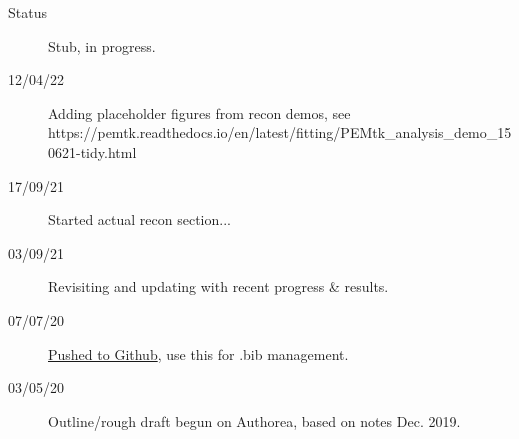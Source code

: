 \begin{description}
\item [{Status}] Stub, in progress.
\item [{12/04/22}] Adding placeholder figures from recon demos, see https://pemtk.readthedocs.io/en/latest/fitting/PEMtk_analysis_demo_150621-tidy.html
\item [{17/09/21}] Started actual recon section...
\item [{03/09/21}] Revisiting and updating with recent progress \& results.
\item [{07/07/20}] \href{https://github.com/phockett/Extracting-Molecular-Frame-Photoionization-Dynamics-from-Experimental-Data}{Pushed to Github}, use this for .bib management.
\item [{03/05/20}] Outline/rough draft begun on Authorea, based on notes Dec. 2019.
\end{description}